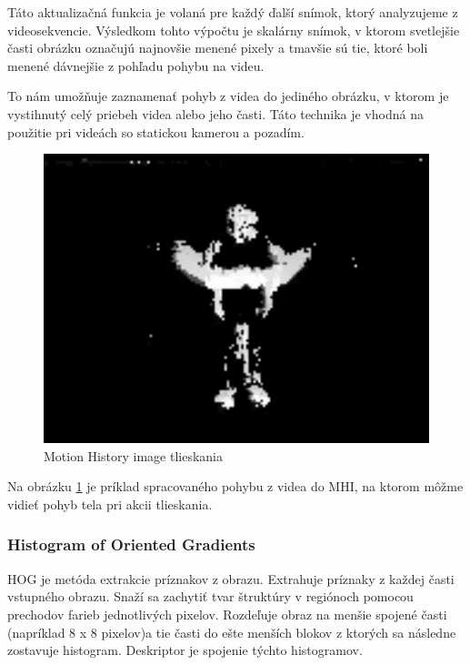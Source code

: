 Táto aktualizačná funkcia je volaná pre každý ďalší snímok, ktorý analyzujeme z videosekvencie. Výsledkom tohto výpočtu je skalárny snímok, v ktorom svetlejšie časti obrázku označujú najnovšie menené pixely a tmavšie sú tie, ktoré boli menené dávnejšie z pohľadu pohybu na videu.

To nám umožňuje zaznamenať pohyb z videa do jediného obrázku, v ktorom je vystihnutý celý priebeh videa alebo jeho časti. Táto technika je vhodná na použitie pri videách so statickou kamerou a pozadím.\cite{c10}

\begin{figure}[H]
  \centering
  \includegraphics[width=13cm]{img/MHIclap.jpg}
  \caption{Motion History image tlieskania}
  \label{MHIclap}
\end{figure}

Na obrázku \ref{MHIclap} je príklad spracovaného pohybu z videa do MHI, na ktorom môžme vidieť pohyb tela pri akcii tlieskania.

	 

\subsubsection{Histogram of Oriented Gradients} \label{HOGlabel}
HOG je metóda extrakcie príznakov z obrazu. Extrahuje príznaky z každej časti vstupného obrazu. Snaží sa zachytiť tvar štruktúry v regiónoch pomocou prechodov farieb jednotlivých pixelov. Rozdeľuje obraz na menšie spojené časti (napríklad 8 x 8 pixelov)a tie časti do ešte menších blokov z ktorých sa následne zostavuje histogram. Deskriptor je spojenie týchto histogramov. 

